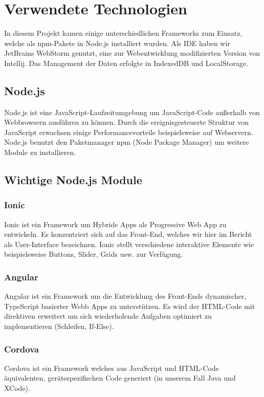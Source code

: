 
\section{Verwendete Technologien}
In diesem Projekt kamen einige unterschiedlichen Frameworks zum Einsatz, welche als npm-Pakete in Node.js installiert wurden. Als IDE haben wir JetBrains WebStorm genutzt, eine zur Webentwicklung modifizierten Version von Intellij. Das Management der Daten erfolgte in IndexedDB und LocalStorage.

\subsection{Node.js}
Node.js ist eine JavaScript-Laufzeitumgebung um JavaScript-Code außerhalb von Webbrowsern ausführen zu können. Durch die ereignisgesteuerte Struktur von JavaScript erwachsen einige Performancevorteile beispielsweise auf Webservern. Node.js benutzt den Paketmanager npm (Node Package Manager) um weitere Module zu installieren.

\subsection{Wichtige Node.js Module}
\subsubsection*{Ionic}
Ionic ist ein Framework um Hybride Apps als Progressive Web App zu entwickeln. Es konzentriert sich auf das Front-End, welches wir hier im Bericht als User-Interface bezeichnen. Ionic stellt verschiedene interaktive Elemente wie beispielsweise Buttons, Slider, Grids usw. zur Verfügung.

\subsubsection*{Angular}
Angular ist ein Framework um die Entwicklung des Front-Ends dynamischer, TypeScript basierter Webb Apps zu unterstützen. Es wird der HTML-Code mit direktiven erweitert um sich wiederholende Aufgaben optimiert zu implementieren (Schleifen, If-Else).

\subsubsection*{Cordova}
Cordova ist ein Framework welches aus JavaScript und HTML-Code äquivalenten, gerätespezifischen Code generiert (in unserem Fall Java und XCode).

